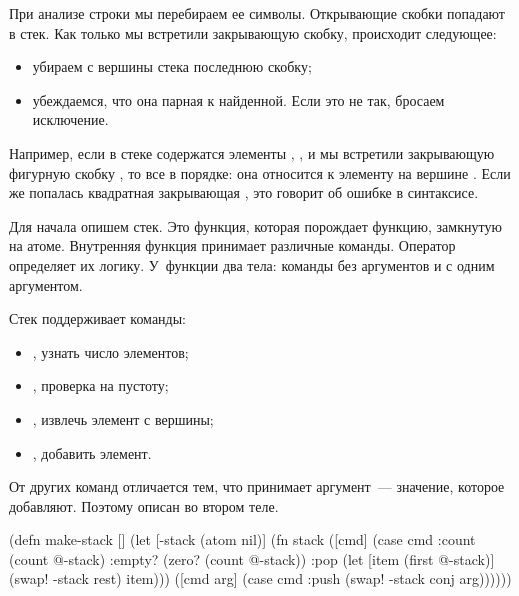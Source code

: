 При анализе строки мы перебираем ее символы. Открывающие скобки попадают в стек. Как только мы встретили закрывающую скобку, происходит следующее:

\begin{itemize}

\item
  убираем с вершины стека последнюю скобку;

\item
  убеждаемся, что она парная к найденной. Если это не так, бросаем исключение.

\end{itemize}

Например, если в стеке содержатся элементы \code{(}, \code{[}, \code{\{} и мы встретили закрывающую фигурную скобку \code{\}}, то все в порядке: она относится к элементу на вершине \code{\{}. Если же попалась квадратная закрывающая \code{]}, это говорит об ошибке в синтаксисе.

\begin{english}
  \begin{text}
"(..[..{..}.." ;; ok
"(..[..{..].." ;; error
  \end{text}
\end{english}

Для начала опишем стек. Это функция, которая порождает функцию, замкнутую на атоме. Внутренняя функция принимает различные команды. Оператор  определяет их логику. У~функции два тела: команды без аргументов и с одним аргументом.

Стек поддерживает команды:

\begin{itemize}

\item
  , узнать число элементов;

\item
  , проверка на пустоту;

\item
  , извлечь элемент с вершины;

\item
  , добавить элемент.

\end{itemize}

От других команд  отличается тем, что принимает аргумент~--- значение, которое добавляют. Поэтому  описан во втором теле.

\begin{english}
  \begin{clojure/lines}
(defn make-stack
  []
  (let [-stack
        (atom nil)]
    (fn stack
      ([cmd]
       (case cmd
         :count (count @-stack)
         :empty? (zero? (count @-stack))
         :pop (let [item (first @-stack)]
                (swap! -stack rest)
                item)))
      ([cmd arg]
       (case cmd
         :push
         (swap! -stack conj arg))))))
  \end{clojure/lines}
\end{english}

